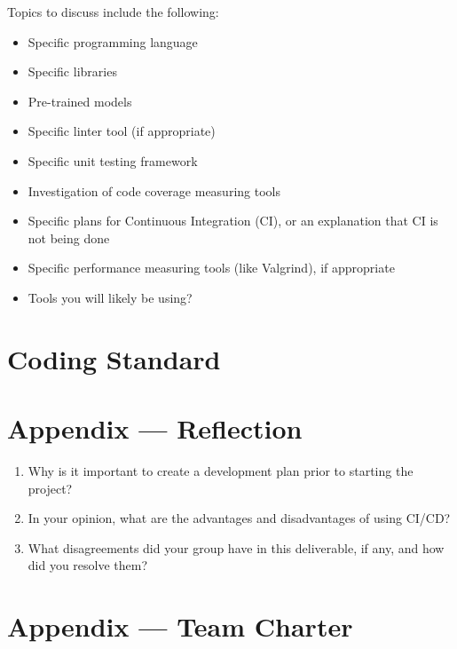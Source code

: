 \documentclass{article}
\begin{document}
Topics to discuss include the following:

\begin{itemize}
\item Specific programming language
\item Specific libraries
\item Pre-trained models
\item Specific linter tool (if appropriate)
\item Specific unit testing framework
\item Investigation of code coverage measuring tools
\item Specific plans for Continuous Integration (CI), or an explanation that CI
  is not being done
\item Specific performance measuring tools (like Valgrind), if
  appropriate
\item Tools you will likely be using?
\end{itemize}


\section{Coding Standard}


\newpage{}

\section*{Appendix --- Reflection}




\begin{enumerate}
    \item Why is it important to create a development plan prior to starting the
    project?
    \item In your opinion, what are the advantages and disadvantages of using
    CI/CD?
    \item What disagreements did your group have in this deliverable, if any,
    and how did you resolve them?
\end{enumerate}

\newpage{}

\section*{Appendix --- Team Charter}
\end{document}
